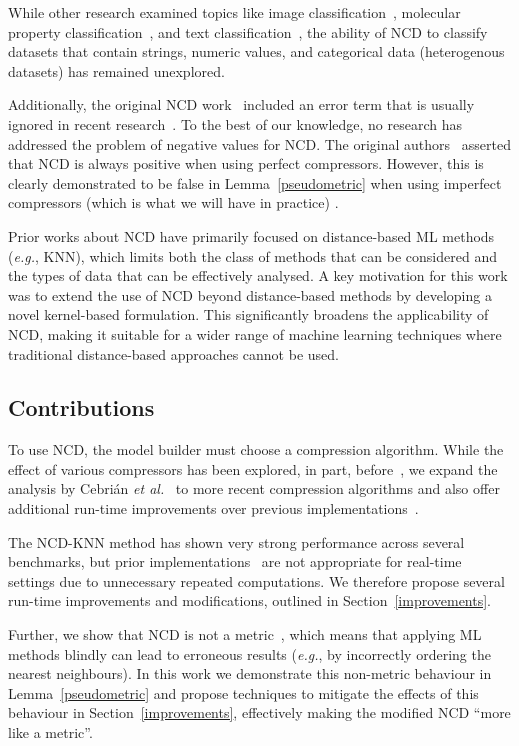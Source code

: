 \documentclass[preprint,12pt]{article}
\begin{document}
While other research examined topics like image classification~\cite{opitz2023gzip}, molecular property classification~\cite{weinreich2023parameter}, and text classification~\cite{nishida2011tweet}, the ability of NCD to classify datasets that contain strings, numeric values, and categorical data (heterogenous datasets) has remained unexplored.

Additionally, the original NCD work~\cite{ncd} included an error term that is usually ignored in recent research~\cite{opitz2023gzip,weinreich2023parameter,nishida2011tweet,jiang2022less}.
To the best of our knowledge, no research has addressed the problem of negative values for NCD.
The original authors~\cite{ncd} asserted that NCD is always positive when using perfect compressors.
However, this is clearly demonstrated to be false in Lemma~\ref{pseudometric} when using imperfect compressors (which is what we will have in practice) .

Prior works about NCD have primarily focused on distance-based ML methods (\textit{e.g.}, KNN), which limits both the class of methods that can be considered and the types of data that can be effectively analysed.
A key motivation for this work was to extend the use of NCD beyond distance-based methods by developing a novel kernel-based formulation. This significantly broadens the applicability of NCD, making it suitable for a wider range of machine learning techniques where traditional distance-based approaches cannot be used.



\subsection{Contributions}

To use NCD, the model builder must choose a compression algorithm.
While the effect of various compressors has been explored, in part, before~\cite{ncd_pitfalls}, we expand the analysis by Cebri\'{a}n \textit{et al.}~\cite{ncd_pitfalls} to more recent compression algorithms and also offer additional run-time improvements over previous implementations~\cite{jiang2022less}.

The NCD-KNN method has shown very strong performance across several benchmarks, but prior implementations~\cite{jiang2022less} are not appropriate for real-time settings due to unnecessary repeated computations.
We therefore propose several run-time improvements and modifications, outlined in Section~\ref{improvements}.

Further, we show that NCD is not a metric~\cite{opitz2023gzip, weinreich2023parameter, nishida2011tweet, jiang2022less}, which means that applying ML methods blindly can lead to erroneous results (\textit{e.g.}, by incorrectly ordering the nearest neighbours).
In this work we demonstrate this non-metric behaviour in Lemma~\ref{pseudometric} and propose techniques to mitigate the effects of this behaviour in Section~\ref{improvements}, effectively making the modified NCD ``more like a metric''.
\end{document}
